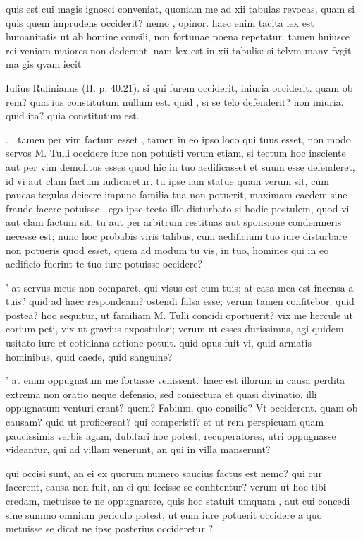  quis est cui magis ignosci conveniat, quoniam me ad xii tabulas revocas, quam si quis quem imprudens occiderit? nemo , opinor. haec enim tacita lex est humanitatis ut ab homine consili, non fortunae poena repetatur. tamen huiusce rei veniam maiores non dederunt. nam lex est in xii tabulis: si telvm manv fvgit ma gis qvam iecit

 Iulius Rufinianus (H. p. 40.21). si qui furem occiderit, iniuria occiderit. quam ob rem? quia ius constitutum nullum est. quid , si se telo defenderit? non iniuria. quid ita? quia constitutum est.

 . . tamen per vim factum esset , tamen in eo ipso loco qui tuus esset, non modo servos M. Tulli occidere iure non potuisti verum etiam, si tectum hoc insciente aut per vim demolitus esses quod hic in tuo aedificasset et suum esse defenderet, id vi aut clam factum iudicaretur. tu ipse iam statue quam verum sit, cum paucas tegulas deicere impune familia tua non potuerit, maximam caedem sine fraude facere potuisse . ego ipse tecto illo disturbato si hodie postulem, quod vi aut clam factum sit, tu aut per arbitrum restituas aut sponsione condemneris necesse est; nunc hoc probabis viris talibus, cum aedificium tuo iure disturbare non potueris quod esset, quem ad modum tu vis, in tuo, homines qui in eo aedificio fuerint te tuo iure potuisse occidere?

 ' at servus meus non comparet, qui visus est cum tuis; at casa mea est incensa a tuis.' quid ad haec respondeam? ostendi falsa esse; verum tamen confitebor. quid postea? hoc sequitur, ut familiam M. Tulli concidi oportuerit? vix me hercule ut corium peti, vix ut gravius expostulari; verum ut esses durissimus, agi quidem usitato iure et cotidiana actione potuit. quid opus fuit vi, quid armatis hominibus, quid caede, quid sanguine?

 ' at enim oppugnatum me fortasse venissent.' haec est illorum in causa perdita extrema non oratio neque defensio, sed coniectura et quasi divinatio. illi oppugnatum venturi erant? quem? Fabium. quo consilio? Vt occiderent. quam ob causam? quid ut proficerent? qui comperisti? et ut rem perspicuam quam paucissimis verbis agam, dubitari hoc potest, recuperatores, utri oppugnasse videantur, qui ad villam venerunt, an qui in villa manserunt?

 qui occisi sunt, an ei ex quorum numero saucius factus est nemo? qui cur facerent, causa non fuit, an ei qui fecisse se confitentur? verum ut hoc tibi credam, metuisse te ne oppugnarere, quis hoc statuit umquam , aut cui concedi sine summo omnium periculo potest, ut eum iure potuerit occidere a quo metuisse se dicat ne ipse posterius occideretur ?
